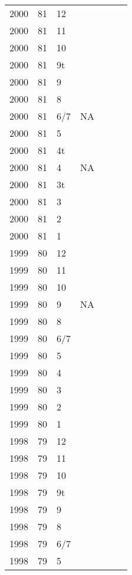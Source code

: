 \begin{longtable}{ |l|l|l|l|p{2.7cm}|l|p{2cm}| }
 2000 & 81 &    12 &         &  &  & \\
 2000 & 81 &    11 &         &  &  & \\
 2000 & 81 &    10 &         &  &  & \\
 2000 & 81 &    9t &         &  &  & \\
 2000 & 81 &     9 &         &  &  & \\
 2000 & 81 &     8 &         &  &  & \\
 2000 & 81 &   6/7 &     NA  &  &  & \\
 2000 & 81 &     5 &         &  &  & \\
 2000 & 81 &    4t &         &  &  & \\
 2000 & 81 &     4 &     NA  &  &  & \\
 2000 & 81 &    3t &         &  &  & \\
 2000 & 81 &     3 &         &  &  & \\
 2000 & 81 &     2 &         &    &  & \\
 2000 & 81 &     1 &         &  &  & \\
 1999 & 80 &    12 &         &  &  & \\
 1999 & 80 &    11 &         &  &  & \\
 1999 & 80 &    10 &         &  &  & \\
 1999 & 80 &     9 &     NA  &  &  & \\
 1999 & 80 &     8 &         &  &  & \\
 1999 & 80 &   6/7 &         &  &  & \\
 1999 & 80 &     5 &         &  &  & \\
 1999 & 80 &     4 &         &  &  & \\
 1999 & 80 &     3 &         &  &  & \\
 1999 & 80 &     2 &         &  &  & \\
 1999 & 80 &     1 &         &  &  & \\
 1998 & 79 &    12 &         &  &  & \\
 1998 & 79 &    11 &         &  &  & \\
 1998 & 79 &    10 &         &  &  & \\
 1998 & 79 &    9t &         &  &  & \\
 1998 & 79 &     9 &         &  &  & \\
 1998 & 79 &     8 &         &  &  & \\
 1998 & 79 &   6/7 &         &  &  & \\
 1998 & 79 &     5 &         &  &  & \\

\end{longtable}
